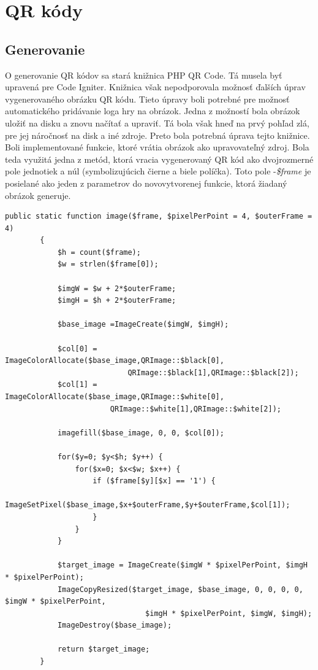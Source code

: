 
\section{QR kódy}
\subsection{Generovanie}
O generovanie QR kódov sa stará knižnica PHP QR Code. Tá musela byť upravená pre Code Igniter. Knižnica však nepodporovala možnosť ďalších úprav vygenerovaného obrázku QR kódu. Tieto úpravy boli potrebné pre možnosť automatického pridávanie loga hry na obrázok. Jedna z možností bola obrázok uložiť na disku a znovu načítať a upraviť. Tá bola však hneď na prvý pohľad zlá, pre jej náročnosť na disk a iné zdroje. Preto bola potrebná úprava tejto knižnice. Boli implementované funkcie, ktoré vrátia obrázok ako upravovateľný zdroj. Bola teda využitá jedna z metód, ktorá vracia vygenerovaný QR kód ako dvojrozmerné pole jednotiek a núl (symbolizujúcich čierne a biele políčka). Toto pole -\emph{\$frame}  je posielané ako jeden z parametrov do novovytvorenej funkcie, ktorá žiadaný obrázok generuje. \

\lstset{language=PHP,
basicstyle=\tiny}
\begin{lstlisting}[frame=single]  % Start your code-block
        public static function image($frame, $pixelPerPoint = 4, $outerFrame = 4) 
        {
            $h = count($frame);
            $w = strlen($frame[0]);
            
            $imgW = $w + 2*$outerFrame;
            $imgH = $h + 2*$outerFrame;
            
            $base_image =ImageCreate($imgW, $imgH);
            
            $col[0] = ImageColorAllocate($base_image,QRImage::$black[0],
            				QRImage::$black[1],QRImage::$black[2]);
            $col[1] = ImageColorAllocate($base_image,QRImage::$white[0],
           				QRImage::$white[1],QRImage::$white[2]);

            imagefill($base_image, 0, 0, $col[0]);

            for($y=0; $y<$h; $y++) {
                for($x=0; $x<$w; $x++) {
                    if ($frame[$y][$x] == '1') {
                        ImageSetPixel($base_image,$x+$outerFrame,$y+$outerFrame,$col[1]); 
                    }
                }
            }
            
            $target_image = ImageCreate($imgW * $pixelPerPoint, $imgH * $pixelPerPoint);
            ImageCopyResized($target_image, $base_image, 0, 0, 0, 0, $imgW * $pixelPerPoint, 
            					$imgH * $pixelPerPoint, $imgW, $imgH);
            ImageDestroy($base_image);
            
            return $target_image;
        }
\end{lstlisting}


